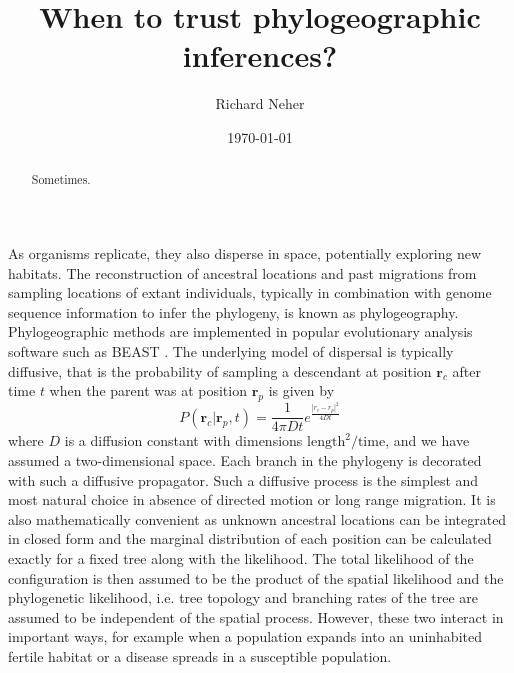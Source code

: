 \documentclass[aps,rmp, onecolumn]{revtex4}
\newcommand{\rvec}{\mathbf{r}}
\begin{document}
\title{When to trust phylogeographic inferences?}
\author{Richard Neher}
\date{\today}
\begin{abstract}
    Sometimes.
\end{abstract}

\maketitle
As organisms replicate, they also disperse in space, potentially exploring new habitats.
The reconstruction of ancestral locations and past migrations from sampling locations of extant individuals, typically in combination with genome sequence information to infer the phylogeny, is known as phylogeography.
Phylogeographic methods are implemented in popular evolutionary analysis software such as BEAST \citep{pybus_unifying_2012}.
The underlying model of dispersal is typically diffusive, that is the probability of sampling a descendant at position $\rvec_c$ after time $t$ when the parent was at position $\rvec_p$ is given by
\begin{equation}
    P(\rvec_c| \rvec_p, t) = \frac{1}{4\pi D t}e^{\frac{|r_c - r_p|^2}{4Dt}}
\end{equation}
where $D$ is a diffusion constant with dimensions $\mathrm{length}^2/\mathrm{time}$, and we have assumed a two-dimensional space.
Each branch in the phylogeny is decorated with such a diffusive propagator.
Such a diffusive process is the simplest and most natural choice in absence of directed motion or long range migration.
It is also mathematically convenient as unknown ancestral locations can be integrated in closed form and the marginal distribution of each position can be calculated exactly for a fixed tree along with the likelihood. 
The total likelihood of the configuration is then assumed to be the product of the spatial likelihood and the phylogenetic likelihood, i.e. tree topology and branching rates of the tree are assumed to be independent of the spatial process.
However, these two interact in important ways, for example when a population expands into an uninhabited fertile habitat or a disease spreads in a susceptible population.
\end{document}
